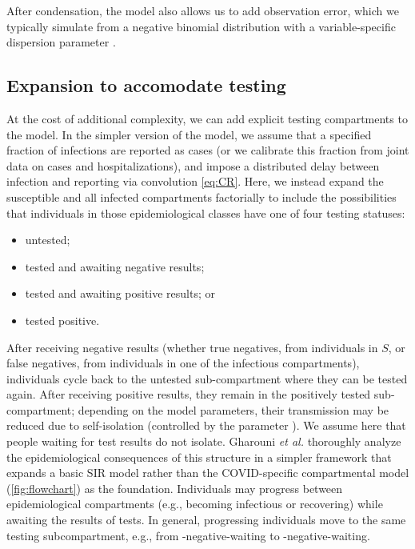 \documentclass[12pt]{article}\usepackage[]{graphicx}\usepackage[]{color}
\begin{document}
After condensation, the model also allows us to add observation error, which we typically simulate from a negative binomial distribution with a variable-specific dispersion parameter \cite{linden2011using}.

\subsection*{Expansion to accomodate testing}

At the cost of additional complexity, we can add explicit testing compartments to the model.  In the simpler version of the model, we assume that a specified fraction of infections are reported as cases (or we calibrate this fraction from joint data on cases and hospitalizations), and impose a distributed delay between infection and reporting via convolution \eqref{eq:CR}.
Here, we instead expand the susceptible and all infected compartments factorially to include the possibilities that individuals in those epidemiological classes have one of four testing statuses:
\begin{itemize}
\item untested;
\item tested and awaiting negative results;
\item tested and awaiting positive results; or 
\item tested positive.
\end{itemize}
After receiving negative results (whether true negatives, from individuals in $S$, or false negatives, from individuals in one of the infectious compartments), individuals cycle back to the untested sub-compartment where they can be tested again. After receiving positive results, they remain in the positively tested sub-compartment; depending on the model parameters, their transmission may be reduced due to self-isolation (controlled by the parameter ).  We assume here that people waiting for test results do not isolate.
Gharouni \emph{et al.}\/ \cite{Ghar+22} thoroughly analyze the epidemiological consequences of this structure in a simpler framework that expands a basic SIR model rather than the COVID-specific compartmental model (\cref{fig:flowchart}) as the foundation.
Individuals may progress between epidemiological compartments (e.g., becoming infectious or recovering) while awaiting the results of tests. In general, progressing individuals move to the same testing subcompartment, e.g., from -negative-waiting to -negative-waiting.
\end{document}
